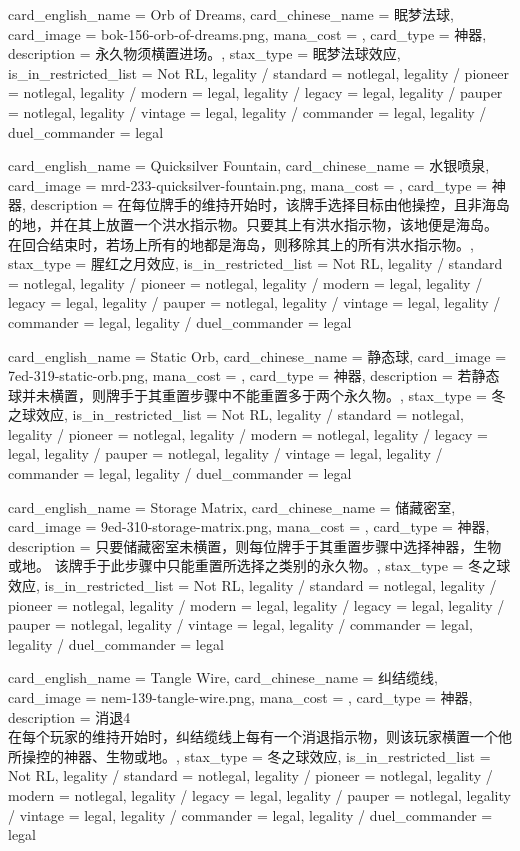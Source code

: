 \documentclass[lang = cn, color = black, 10pt]{AllThatStax}
\begin{document}
\card
{
	card_english_name = {Orb of Dreams},
	card_chinese_name = {眠梦法球},
	card_image = bok-156-orb-of-dreams.png,
	mana_cost = ,
	card_type = 神器,
	description = {永久物须横置进场。},
	stax_type = 眠梦法球效应,
	is_in_restricted_list = Not RL,
	legality / standard = notlegal,
	legality / pioneer = notlegal,
	legality / modern = legal,
	legality / legacy = legal,
	legality / pauper = notlegal,
	legality / vintage = legal,
	legality / commander = legal,
	legality / duel_commander = legal
}

\card
{
	card_english_name = {Quicksilver Fountain},
	card_chinese_name = {水银喷泉},
	card_image = mrd-233-quicksilver-fountain.png,
	mana_cost = ,
	card_type = 神器,
	description = {在每位牌手的维持开始时，该牌手选择目标由他操控，且非海岛的地，并在其上放置一个洪水指示物。只要其上有洪水指示物，该地便是海岛。\\
在回合结束时，若场上所有的地都是海岛，则移除其上的所有洪水指示物。},
	stax_type = 腥红之月效应,
	is_in_restricted_list = Not RL,
	legality / standard = notlegal,
	legality / pioneer = notlegal,
	legality / modern = legal,
	legality / legacy = legal,
	legality / pauper = notlegal,
	legality / vintage = legal,
	legality / commander = legal,
	legality / duel_commander = legal
}

\card
{
	card_english_name = {Static Orb},
	card_chinese_name = {静态球},
	card_image = 7ed-319-static-orb.png,
	mana_cost = ,
	card_type = 神器,
	description = {若静态球并未横置，则牌手于其重置步骤中不能重置多于两个永久物。},
	stax_type = 冬之球效应,
	is_in_restricted_list = Not RL,
	legality / standard = notlegal,
	legality / pioneer = notlegal,
	legality / modern = notlegal,
	legality / legacy = legal,
	legality / pauper = notlegal,
	legality / vintage = legal,
	legality / commander = legal,
	legality / duel_commander = legal
}

\card
{
	card_english_name = {Storage Matrix},
	card_chinese_name = {储藏密室},
	card_image = 9ed-310-storage-matrix.png,
	mana_cost = ,
	card_type = 神器,
	description = {只要储藏密室未横置，则每位牌手于其重置步骤中选择神器，生物或地。 该牌手于此步骤中只能重置所选择之类别的永久物。},
	stax_type = 冬之球效应,
	is_in_restricted_list = Not RL,
	legality / standard = notlegal,
	legality / pioneer = notlegal,
	legality / modern = legal,
	legality / legacy = legal,
	legality / pauper = notlegal,
	legality / vintage = legal,
	legality / commander = legal,
	legality / duel_commander = legal
}

\card
{
	card_english_name = {Tangle Wire},
	card_chinese_name = {纠结缆线},
	card_image = nem-139-tangle-wire.png,
	mana_cost = ,
	card_type = 神器,
	description = {消退4\\
在每个玩家的维持开始时，纠结缆线上每有一个消退指示物，则该玩家横置一个他所操控的神器、生物或地。},
	stax_type = 冬之球效应,
	is_in_restricted_list = Not RL,
	legality / standard = notlegal,
	legality / pioneer = notlegal,
	legality / modern = notlegal,
	legality / legacy = legal,
	legality / pauper = notlegal,
	legality / vintage = legal,
	legality / commander = legal,
	legality / duel_commander = legal
}
\end{document}
